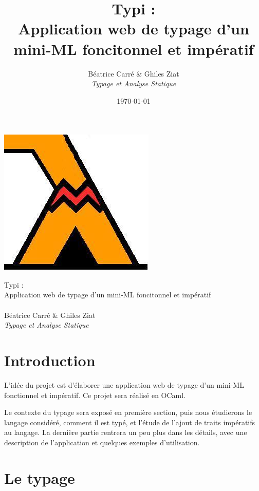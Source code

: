 \documentclass[a4paper, 11pt]{article}
\title{\vfill
  \huge Typi : \\
  Application web de typage d'un mini-ML foncitonnel et impératif\\
}
\author{
  Béatrice Carré \& Ghiles Ziat\\
  \emph{Typage et Analyse Statique}\\
}
\date{\today\vfill}
\begin{document}
\begin{titlepage}%
\begin{center}
\includegraphics[scale=0.6]{typi_logo.jpg}
\end{center}
\begin{center}
  \huge{Typi : \\
  Application web de typage d'un mini-ML foncitonnel et impératif}\\
  \ \\
\Large
  Béatrice Carré \& Ghiles Ziat\\
  \emph{Typage et Analyse Statique}\\
\end{center}
\tableofcontents
\end{titlepage} 



\newpage
\section*{Introduction}

L'idée du projet est d'élaborer une application web de typage d'un mini-ML fonctionnel et impératif. Ce projet sera réalisé en OCaml.

Le contexte du typage sera exposé en première section, puis nous étudierons le langage considéré, comment il est typé, et l'étude de l'ajout de traits impératifs au langage. 
La dernière partie rentrera un peu plus dans les détails, avec une description de l'application et quelques exemples d'utilisation.


\section{Le typage}
\end{document}
